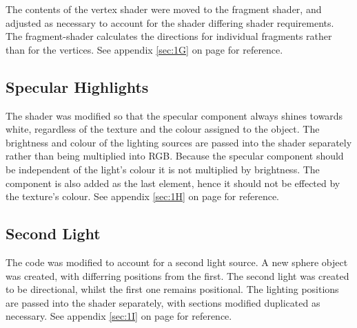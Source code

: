 \documentclass{article}
\begin{document}
The contents of the vertex shader were moved to the fragment shader, and adjusted as necessary to account for the shader differing shader requirements. The fragment-shader calculates the directions for individual fragments rather than for the vertices.
\newline
\newline
See appendix \ref{sec:1G} on page \pageref{sec:1G} for reference.


\subsection{Specular Highlights}

The shader was modified so that the specular component always shines towards white, regardless of the texture and the colour assigned to the object. The brightness and colour of the lighting sources are passed into the shader separately rather than being multiplied into RGB. Because the specular component should be independent of the light's colour it is not multiplied by brightness. The component is also added as the last element, hence it should not be effected by the texture's colour.
\newline
\newline
See appendix \ref{sec:1H} on page \pageref{sec:1H} for reference.



\subsection{Second Light}

The code was modified to account for a second light source. A new sphere object was created, with differring positions from the first. The second light was created to be directional, whilst the first one remains positional. The lighting positions are passed into the shader separately, with sections modified duplicated as necessary.
\newline
\newline
See appendix \ref{sec:1I} on page \pageref{sec:1I} for reference.
\end{document}
